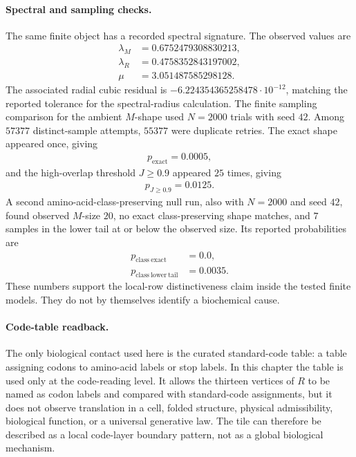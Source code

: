 \paragraph{Spectral and sampling checks.}
The same finite object has a recorded spectral signature.  The observed values are
$$
\begin{aligned}
\lambda_M&=0.6752479308830213,\\
\lambda_R&=0.4758352843197002,\\
\mu&=3.051487585298128.
\end{aligned}
$$
The associated radial cubic residual is $-6.224354365258478\cdot 10^{-12}$, matching the reported tolerance for the spectral-radius calculation.  The finite sampling comparison for the ambient $M$-shape used $N=2000$ trials with seed $42$.  Among $57377$ distinct-sample attempts, $55377$ were duplicate retries.  The exact shape appeared once, giving
$$
\begin{aligned}
p_{\mathrm{exact}}=0.0005,
\end{aligned}
$$
and the high-overlap threshold $J\geq 0.9$ appeared $25$ times, giving
$$
\begin{aligned}
p_{J\geq 0.9}=0.0125.
\end{aligned}
$$
A second amino-acid-class-preserving null run, also with $N=2000$ and seed $42$, found observed $M$-size $20$, no exact class-preserving shape matches, and $7$ samples in the lower tail at or below the observed size.  Its reported probabilities are
$$
\begin{aligned}
p_{\mathrm{class\ exact}}&=0.0,\\
p_{\mathrm{class\ lower\ tail}}&=0.0035.
\end{aligned}
$$
These numbers support the local-row distinctiveness claim inside the tested finite models.  They do not by themselves identify a biochemical cause.

\paragraph{Code-table readback.}
The only biological contact used here is the curated standard-code table: a table assigning codons to amino-acid labels or stop labels.  In this chapter the table is used only at the code-reading level.  It allows the thirteen vertices of $R$ to be named as codon labels and compared with standard-code assignments, but it does not observe translation in a cell, folded structure, physical admissibility, biological function, or a universal generative law.  The tile can therefore be described as a local code-layer boundary pattern, not as a global biological mechanism.

